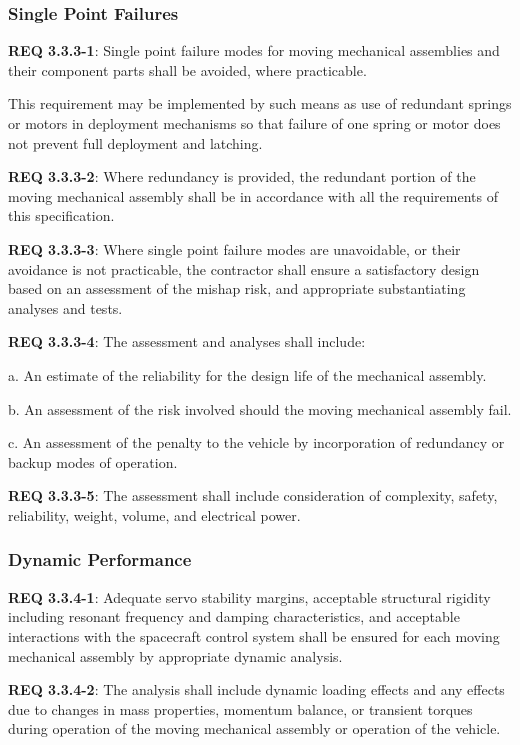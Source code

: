 \documentclass[12pt]{article}
\begin{document}
\subsubsection{Single Point Failures} %
\noindent \textbf{REQ 3.3.3-1}: Single point failure modes for moving mechanical assemblies and their component parts shall be avoided, where practicable. 

This requirement may be implemented by such means as use of redundant springs or motors in deployment mechanisms so that failure of one spring or motor does not prevent full deployment and latching. 

\noindent \textbf{REQ 3.3.3-2}: Where redundancy is provided, the redundant portion of the moving mechanical assembly shall be in accordance with all the requirements of this specification. 

\noindent \textbf{REQ 3.3.3-3}: Where single point failure modes are unavoidable, or their avoidance is not practicable, the contractor shall ensure a satisfactory design based on an assessment of the mishap risk, and appropriate substantiating analyses and tests. 

\noindent \textbf{REQ 3.3.3-4}: The assessment and analyses shall include:

a. An estimate of the reliability for the design life of the mechanical assembly.

b. An assessment of the risk involved should the moving mechanical assembly fail.

c. An assessment of the penalty to the vehicle by incorporation of redundancy or backup modes of operation. 

\noindent \textbf{REQ 3.3.3-5}: The assessment shall include consideration of complexity, safety, reliability, weight, volume, and electrical power.


\subsubsection{Dynamic Performance} %
\noindent \textbf{REQ 3.3.4-1}: Adequate servo stability margins, acceptable structural rigidity including resonant frequency and damping characteristics, and acceptable interactions with the spacecraft control system shall be ensured for each moving mechanical assembly by appropriate dynamic analysis. 

\noindent \textbf{REQ  3.3.4-2}: The analysis shall include dynamic loading effects and any effects due to changes in mass properties, momentum balance, or transient torques during operation of the moving mechanical assembly or operation of the vehicle.
\end{document}
